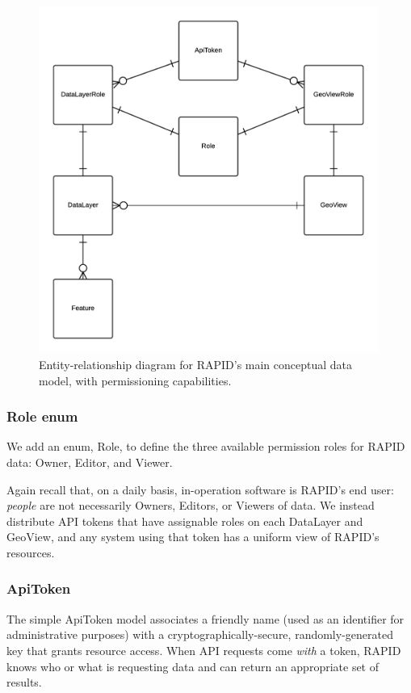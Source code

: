 \begin{figure}[ht]
    \centering
    \includegraphics[width=0.99\textwidth]{figures/er.png}
    \caption{Entity-relationship diagram for RAPID's main conceptual data model, with permissioning capabilities.}
    \label{fig:er}
\end{figure}

\subsubsection{Role enum}
We add an enum, Role, to define the three available permission roles for RAPID data: Owner, Editor, and Viewer.

Again recall that, on a daily basis, in-operation software is RAPID's end user: \textit{people} are not necessarily Owners, Editors, or Viewers of data. We instead distribute API tokens that have assignable roles on each DataLayer and GeoView, and any system using that token has a uniform view of RAPID's resources.

\subsubsection{ApiToken}
The simple ApiToken model associates a friendly name (used as an identifier for administrative purposes) with a cryptographically-secure, randomly-generated key that grants resource access. When API requests come \textit{with} a token, RAPID knows who or what is requesting data and can return an appropriate set of results.

